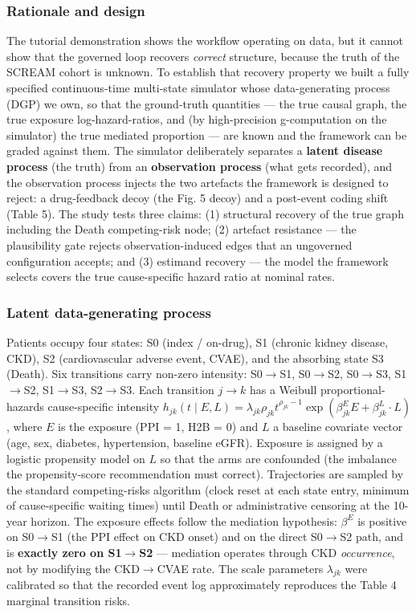 \documentclass[sn-vancouver-num]{sn-jnl}
\begin{document}
\subsubsection{Rationale and design}
The tutorial demonstration shows the workflow operating on data, but it cannot show that the governed loop recovers \textit{correct} structure, because the truth of the SCREAM cohort is unknown. To establish that recovery property we built a fully specified continuous-time multi-state simulator whose data-generating process (DGP) we own, so that the ground-truth quantities --- the true causal graph, the true exposure log-hazard-ratios, and (by high-precision g-computation on the simulator) the true mediated proportion --- are known and the framework can be graded against them. The simulator deliberately separates a \textbf{latent disease process} (the truth) from an \textbf{observation process} (what gets recorded), and the observation process injects the two artefacts the framework is designed to reject: a drug-feedback decoy (the Fig. 5 decoy) and a post-event coding shift (Table 5). The study tests three claims: (1) structural recovery of the true graph including the Death competing-risk node; (2) artefact resistance --- the plausibility gate rejects observation-induced edges that an ungoverned configuration accepts; and (3) estimand recovery --- the model the framework selects covers the true cause-specific hazard ratio at nominal rates.

\subsubsection{Latent data-generating process}
Patients occupy four states: S0 (index / on-drug), S1 (chronic kidney disease, CKD), S2 (cardiovascular adverse event, CVAE), and the absorbing state S3 (Death). Six transitions carry non-zero intensity: S0$\rightarrow$S1, S0$\rightarrow$S2, S0$\rightarrow$S3, S1$\rightarrow$S2, S1$\rightarrow$S3, S2$\rightarrow$S3. Each transition $j\rightarrow k$ has a Weibull proportional-hazards cause-specific intensity $h_{jk}(t \mid E, L) = \lambda_{jk} \rho_{jk} t^{\rho_{jk} - 1} \exp(\beta^E_{jk} E + \beta^L_{jk} \cdot L)$, where $E$ is the exposure (PPI = 1, H2B = 0) and $L$ a baseline covariate vector (age, sex, diabetes, hypertension, baseline eGFR). Exposure is assigned by a logistic propensity model on $L$ so that the arms are confounded (the imbalance the propensity-score recommendation must correct). Trajectories are sampled by the standard competing-risks algorithm (clock reset at each state entry, minimum of cause-specific waiting times) until Death or administrative censoring at the 10-year horizon. The exposure effects follow the mediation hypothesis: $\beta^E$ is positive on S0$\rightarrow$S1 (the PPI effect on CKD onset) and on the direct S0$\rightarrow$S2 path, and is \textbf{exactly zero on S1$\rightarrow$S2} --- mediation operates through CKD \textit{occurrence}, not by modifying the CKD$\rightarrow$CVAE rate. The scale parameters $\lambda_{jk}$ were calibrated so that the recorded event log approximately reproduces the Table 4 marginal transition risks.
\end{document}
